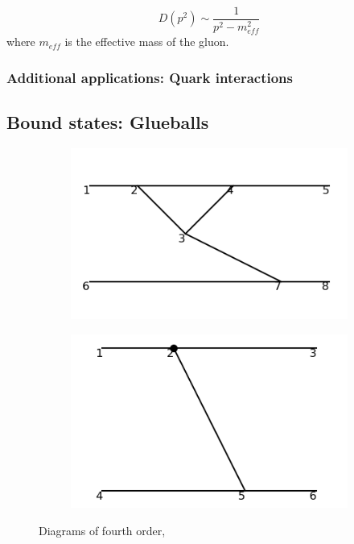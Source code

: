 \documentclass[11pt,a4paper,twoside,pdf]{article}
\numberwithin{equation}{section}
\begin{document}
\begin{equation}
    D(p^2) \sim \frac{1}{p^2 - m_{eff}^2} 
\end{equation}
where $m_{eff}$ is the effective mass of the gluon. 

\subsubsection{Additional applications: Quark interactions}

\subsection{Bound states: Glueballs}




\begin{figure}[h!]
    \centering
    \begin{subfigure}[t]{0.33\textwidth}
        \centering
        \includegraphics[width=\textwidth]{plots/order4/1.png}
        \caption{ }
    \end{subfigure}%
    \begin{subfigure}[t]{0.33\textwidth}
        \centering
        \includegraphics[width=\textwidth]{plots/order4/counterterms/1.png}
        \caption{ }
    \end{subfigure}
    \caption{Diagrams of fourth order,}
    \label{fig:order4/1}
\end{figure}
\end{document}
